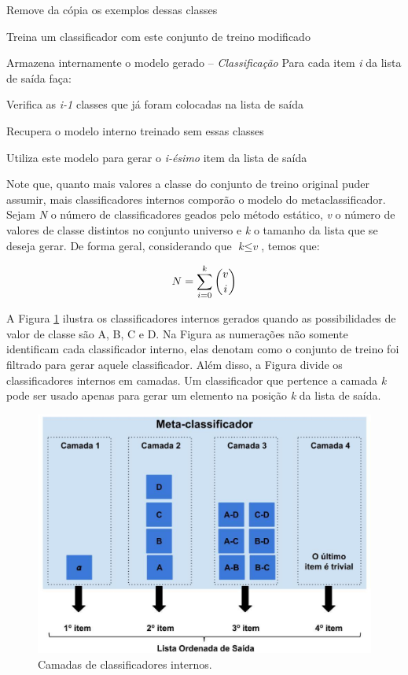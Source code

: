 \quad Remove da cópia os exemplos dessas classes

\quad Treina um classificador com este conjunto de treino modificado

\quad Armazena internamente o modelo gerado\newline
-- \textit{Classificação}\newline
Para cada item \textit{i} da lista de saída faça:

\quad Verifica as \textit{i-1} classes que já foram colocadas na lista de saída

\quad Recupera o modelo interno treinado sem essas classes

\quad Utiliza este modelo para gerar o \textit{i-ésimo} item da lista de saída

\hline
\hfill \break

Note que, quanto mais valores a classe do conjunto de treino original puder assumir, mais classificadores internos comporão o modelo do metaclassificador.
Sejam \textit{N} o número de classificadores geados pelo método estático, \textit{v} o número de valores de classe distintos no conjunto universo e \textit{k} o tamanho da lista que se deseja gerar. 
De forma geral, considerando que $\textit{k} \leq \textit{v}$, temos que:

\begin{equation*}

\centering
\textit{N} = \sum\limits_{i=0}^k \binom{v}{i}

\end{equation*}

A Figura \ref{fig:metodoproposto03} ilustra os classificadores internos gerados quando as possibilidades de valor de classe são A, B, C e D. Na Figura as numerações não somente identificam cada classificador interno, elas denotam como o conjunto de treino foi filtrado para gerar aquele classificador. Além disso, a Figura divide os classificadores internos em camadas. Um classificador que pertence a camada \textit{k} pode ser usado apenas para gerar um elemento na posição \textit{k} da lista de saída.

\begin{figure}[h!]
  \includegraphics[width=\linewidth]{images/metodoproposto03.eps}
  \caption{Camadas de classificadores internos.}
  \label{fig:metodoproposto03}
\end{figure}

